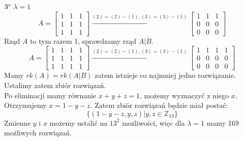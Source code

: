 \documentclass[12pt,a4paper]{article}
\begin{document}
\newpage
\noindent
\textbf{\(3\degree\)} \(\lambda=1\)
\[
A=
\left[
\begin{array}{ccc}
1 & 1 & 1\\
1 & 1 & 1\\
1 & 1 & 1
\end{array}\right]
\xrightarrow{(2)=(2)-(1),(3)=(3)-(1)}
\left[
\begin{array}{ccc}
1 & 1 & 1\\
0 & 0 & 0\\
0 & 0 & 0
\end{array}\right]
\]
Rząd \(A\) to tym razem 1, sprawdzamy rząd \(A|B\).
\[
A=
\left[
\begin{array}{cccc}
1 & 1 & 1 & 1\\
1 & 1 & 1 & 1\\
1 & 1 & 1 & 1
\end{array}\right]
\xrightarrow{(2)=(2)-(1),(3)=(3)-(1)}
\left[
\begin{array}{cccc}
1 & 1 & 1 & 1\\
0 & 0 & 0 & 0\\
0 & 0 & 0 & 0
\end{array}\right]
\]
Mamy \(rk(A) = rk(A|B)\) zatem istnieje co najmniej jedno rozwiązanie. Ustalimy zatem zbiór rozwiązań.\\
Po eliminacji mamy równanie \(x+y+z=1\), możemy wyznaczyć z niego \(x\). Otrzymujemy \(x=1-y-z\).
Zatem zbiór rozwiązań będzie miał postać:
\[
\{(1-y-z,y,z) | y,z\in \mathbb{Z}_{13}\}
\]
Zmienne \(y\) i \(x\) możemy ustalić na \(13^2\) możliwości, więc dla \(\lambda=1\) mamy 169 możliwych rozwiązań.
\end{document}

